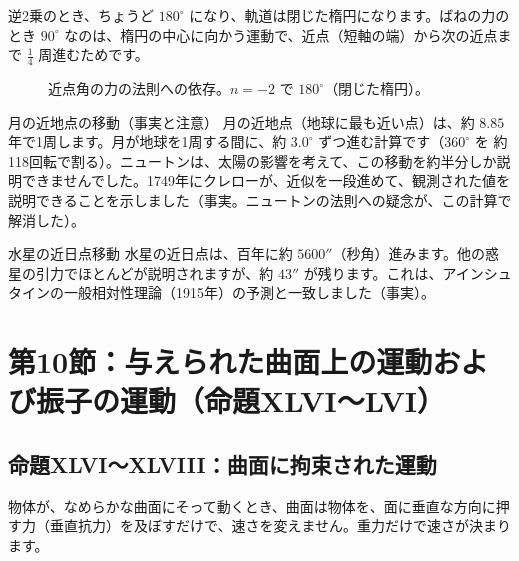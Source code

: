 \documentclass[a4paper,11pt,openany]{ltjsbook}
\begin{document}
逆2乗のとき、ちょうど $180^\circ$ になり、軌道は閉じた楕円になります。ばねの力のとき $90^\circ$ なのは、楕円の中心に向かう運動で、近点（短軸の端）から次の近点まで $\frac14$ 周進むためです。

\begin{figure}[htbp]
\centering
{}
\caption{近点角の力の法則への依存。$n=-2$ で $180^\circ$（閉じた楕円）。}
\end{figure}

\begin{examplebox}{月の近地点の移動（事実と注意）}
月の近地点（地球に最も近い点）は、約 $8.85$ 年で1周します。月が地球を1周する間に、約 $3.0^\circ$ ずつ進む計算です（$360^\circ$ を 約118回転で割る）。ニュートンは、太陽の影響を考えて、この移動を約半分しか説明できませんでした。1749年にクレローが、近似を一段進めて、観測された値を説明できることを示しました（事実。ニュートンの法則への疑念が、この計算で解消した）。
\end{examplebox}

\begin{examplebox}{水星の近日点移動}
水星の近日点は、百年に約 $5600''$（秒角）進みます。他の惑星の引力でほとんどが説明されますが、約 $43''$ が残ります。これは、アインシュタインの一般相対性理論（1915年）の予測と一致しました（事実）。
\end{examplebox}

\section{第10節：与えられた曲面上の運動および振子の運動（命題XLVI〜LVI）}

\subsection{命題XLVI〜XLVIII：曲面に拘束された運動}

物体が、なめらかな曲面にそって動くとき、曲面は物体を、面に垂直な方向に押す力（垂直抗力）を及ぼすだけで、速さを変えません。重力だけで速さが決まります。
\end{document}
